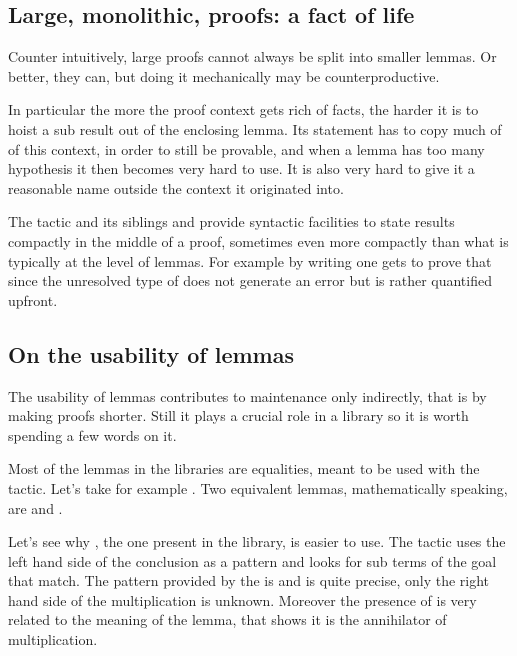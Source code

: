 \subsection{Large, monolithic, proofs: a fact of life}

Counter intuitively, large proofs cannot always be split into smaller
lemmas. Or better, they can, but doing it mechanically 
may be counterproductive.

In particular the more the proof context gets rich of facts, the harder it is
to hoist a sub result out of the enclosing lemma. Its statement has to
copy much of of this context, in order to still be provable,
and when a lemma has too many hypothesis it then becomes very hard to
use. It is also very hard to give it a reasonable name outside the
context it originated into.

The  tactic and its siblings  and 
provide syntactic facilities to state results
compactly in the middle of a proof, sometimes even more compactly than
what is typically at the level of lemmas. 
For example by writing  one
gets to prove that  since the unresolved
type of  does not generate an error but is rather quantified
upfront.

\subsection{On the usability of lemmas}

The usability of lemmas contributes to maintenance only indirectly,
that is by making proofs shorter. Still it plays a crucial role
in a library so it is worth spending a few words on it.

Most of the lemmas in the \mcbMC{} libraries are equalities, meant to be
used with the  tactic. Let's take for example . Two equivalent lemmas, mathematically speaking, are
and 
.

Let's see why , the one present in the library, is easier to use.
The  tactic uses the left hand side of the conclusion as
a pattern and looks for sub terms of the goal that match. 
The pattern
provided by the  is  and is quite precise, only the
right hand side of the multiplication is unknown. Moreover the presence of
 is very related to the meaning of the lemma, that shows it is
the annihilator of multiplication.

